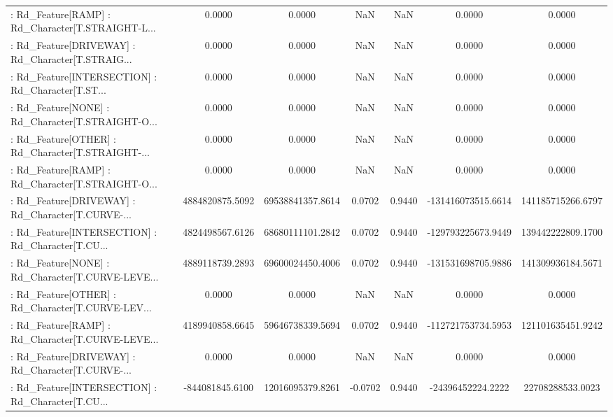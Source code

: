 \begin{longtable}{p{4cm}cccccc}
 : Rd\_Feature[RAMP] : Rd\_Character[T.STRAIGHT-L... &            0.0000 &            0.0000 &     NaN &          NaN &             0.0000 &            0.0000 \\
 : Rd\_Feature[DRIVEWAY] : Rd\_Character[T.STRAIG... &            0.0000 &            0.0000 &     NaN &          NaN &             0.0000 &            0.0000 \\
 : Rd\_Feature[INTERSECTION] : Rd\_Character[T.ST... &            0.0000 &            0.0000 &     NaN &          NaN &             0.0000 &            0.0000 \\
 : Rd\_Feature[NONE] : Rd\_Character[T.STRAIGHT-O... &            0.0000 &            0.0000 &     NaN &          NaN &             0.0000 &            0.0000 \\
 : Rd\_Feature[OTHER] : Rd\_Character[T.STRAIGHT-... &            0.0000 &            0.0000 &     NaN &          NaN &             0.0000 &            0.0000 \\
 : Rd\_Feature[RAMP] : Rd\_Character[T.STRAIGHT-O... &            0.0000 &            0.0000 &     NaN &          NaN &             0.0000 &            0.0000 \\
 : Rd\_Feature[DRIVEWAY] : Rd\_Character[T.CURVE-... &   4884820875.5092 &  69538841357.8614 &  0.0702 &       0.9440 & -131416073515.6614 & 141185715266.6797 \\
 : Rd\_Feature[INTERSECTION] : Rd\_Character[T.CU... &   4824498567.6126 &  68680111101.2842 &  0.0702 &       0.9440 & -129793225673.9449 & 139442222809.1700 \\
 : Rd\_Feature[NONE] : Rd\_Character[T.CURVE-LEVE... &   4889118739.2893 &  69600024450.4006 &  0.0702 &       0.9440 & -131531698705.9886 & 141309936184.5671 \\
 : Rd\_Feature[OTHER] : Rd\_Character[T.CURVE-LEV... &            0.0000 &            0.0000 &     NaN &          NaN &             0.0000 &            0.0000 \\
 : Rd\_Feature[RAMP] : Rd\_Character[T.CURVE-LEVE... &   4189940858.6645 &  59646738339.5694 &  0.0702 &       0.9440 & -112721753734.5953 & 121101635451.9242 \\
 : Rd\_Feature[DRIVEWAY] : Rd\_Character[T.CURVE-... &            0.0000 &            0.0000 &     NaN &          NaN &             0.0000 &            0.0000 \\
 : Rd\_Feature[INTERSECTION] : Rd\_Character[T.CU... &   -844081845.6100 &  12016095379.8261 & -0.0702 &       0.9440 &  -24396452224.2222 &  22708288533.0023 \\

\end{longtable}
